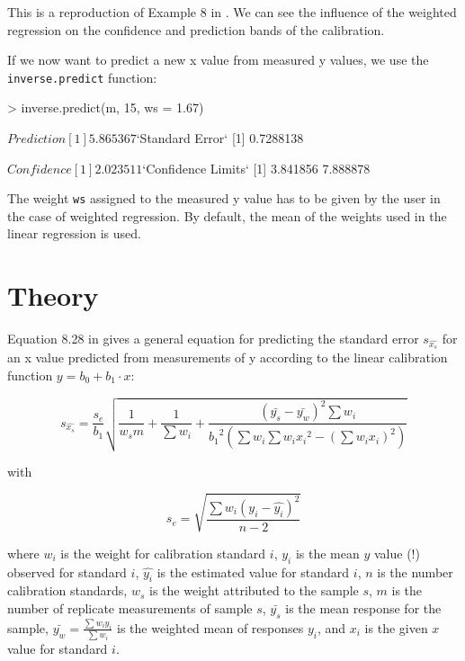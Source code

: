 \documentclass[a4paper]{article}
\begin{document}
This is a reproduction of Example 8 in \cite{massart97}. We can
see the influence of the weighted regression on the confidence
and prediction bands of the calibration.

If we now want to predict a new x value from measured y values,
we use the \texttt{inverse.predict} function:

\begin{Schunk}
\begin{Sinput}
> inverse.predict(m, 15, ws = 1.67)
\end{Sinput}
\begin{Soutput}
$Prediction
[1] 5.865367

$`Standard Error`
[1] 0.7288138

$Confidence
[1] 2.023511

$`Confidence Limits`
[1] 3.841856 7.888878
\end{Soutput}
\end{Schunk}

The weight \texttt{ws} assigned to the measured y value has to be 
given by the user in the case of weighted regression. By default, 
the mean of the weights used in the linear regression is used.

\section*{Theory}
Equation 8.28 in \cite{massart97} gives a general equation for predicting the
standard error $s_{\hat{x_s}}$ for an x value predicted from measurements of y
according to the linear calibration function $ y = b_0 + b_1 \cdot x$:

\begin{equation}
s_{\hat{x_s}} = \frac{s_e}{b_1} \sqrt{\frac{1}{w_s m} + \frac{1}{\sum{w_i}} +
    \frac{(\bar{y_s} - \bar{y_w})^2 \sum{w_i}}
        {{b_1}^2 \left( \sum{w_i} \sum{w_i {x_i}^2} - {\left( \sum{ w_i x_i } \right)}^2 \right) }}
\end{equation}

with

\begin{equation}
s_e = \sqrt{ \frac{\sum w_i (y_i - \hat{y_i})^2}{n - 2}}
\end{equation}

where $w_i$ is the weight for calibration standard $i$, $y_i$ is the mean $y$
value (!) observed for standard $i$, $\hat{y_i}$ is the estimated value for
standard $i$, $n$ is the number calibration standards, $w_s$ is the weight
attributed to the sample $s$, $m$ is the number of replicate measurements of
sample $s$, $\bar{y_s}$ is the mean response for the sample, 
$\bar{y_w} = \frac{\sum{w_i y_i}}{\sum{w_i}}$ is the weighted mean of responses
$y_i$, and $x_i$ is the given $x$ value for standard $i$.
\end{document}
